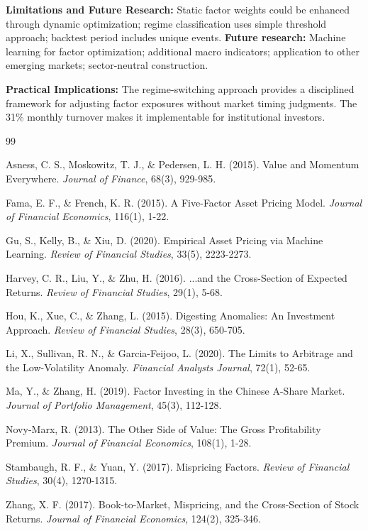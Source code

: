\documentclass[12pt,a4paper]{article}
\begin{document}
\textbf{Limitations and Future Research:} Static factor weights could be enhanced through dynamic optimization; regime classification uses simple threshold approach; backtest period includes unique events. \textbf{Future research:} Machine learning for factor optimization; additional macro indicators; application to other emerging markets; sector-neutral construction.

\textbf{Practical Implications:} The regime-switching approach provides a disciplined framework for adjusting factor exposures without market timing judgments. The 31\% monthly turnover makes it implementable for institutional investors.

\begin{thebibliography}{99}

Asness, C. S., Moskowitz, T. J., \& Pedersen, L. H. (2015). Value and Momentum Everywhere. \textit{Journal of Finance}, 68(3), 929-985.

Fama, E. F., \& French, K. R. (2015). A Five-Factor Asset Pricing Model. \textit{Journal of Financial Economics}, 116(1), 1-22.

Gu, S., Kelly, B., \& Xiu, D. (2020). Empirical Asset Pricing via Machine Learning. \textit{Review of Financial Studies}, 33(5), 2223-2273.

Harvey, C. R., Liu, Y., \& Zhu, H. (2016). ...and the Cross-Section of Expected Returns. \textit{Review of Financial Studies}, 29(1), 5-68.

Hou, K., Xue, C., \& Zhang, L. (2015). Digesting Anomalies: An Investment Approach. \textit{Review of Financial Studies}, 28(3), 650-705.

Li, X., Sullivan, R. N., \& Garcia-Feijoo, L. (2020). The Limits to Arbitrage and the Low-Volatility Anomaly. \textit{Financial Analysts Journal}, 72(1), 52-65.

Ma, Y., \& Zhang, H. (2019). Factor Investing in the Chinese A-Share Market. \textit{Journal of Portfolio Management}, 45(3), 112-128.

Novy-Marx, R. (2013). The Other Side of Value: The Gross Profitability Premium. \textit{Journal of Financial Economics}, 108(1), 1-28.

Stambaugh, R. F., \& Yuan, Y. (2017). Mispricing Factors. \textit{Review of Financial Studies}, 30(4), 1270-1315.

Zhang, X. F. (2017). Book-to-Market, Mispricing, and the Cross-Section of Stock Returns. \textit{Journal of Financial Economics}, 124(2), 325-346.

\end{thebibliography}
\end{document}
